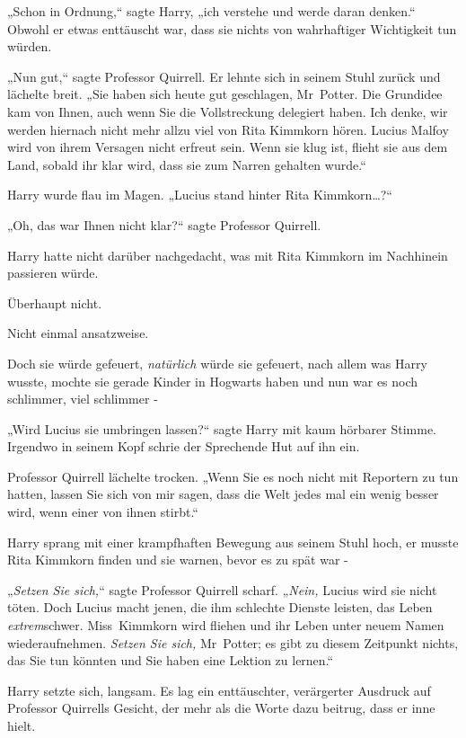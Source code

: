 {„Schon in Ordnung,“ sagte Harry, „ich verstehe und werde daran denken.“ Obwohl er etwas enttäuscht war, dass sie nichts von wahrhaftiger Wichtigkeit tun würden.

„Nun gut,“ sagte Professor Quirrell. Er lehnte sich in seinem Stuhl zurück und lächelte breit. „Sie haben sich heute gut geschlagen, Mr~Potter. Die Grundidee kam von Ihnen, auch wenn Sie die Vollstreckung delegiert haben. Ich denke, wir werden hiernach nicht mehr allzu viel von Rita Kimmkorn hören. Lucius Malfoy wird von ihrem Versagen nicht erfreut sein. Wenn sie klug ist, flieht sie aus dem Land, sobald ihr klar wird, dass sie zum Narren gehalten wurde.“

Harry wurde flau im Magen. „Lucius stand hinter Rita Kimmkorn…?“

„Oh, das war Ihnen nicht klar?“ sagte Professor Quirrell.

Harry hatte nicht darüber nachgedacht, was mit Rita Kimmkorn im Nachhinein passieren würde.

Überhaupt nicht.

Nicht einmal ansatzweise.

Doch sie würde gefeuert, \emph{natürlich} würde sie gefeuert, nach allem was Harry wusste, mochte sie gerade Kinder in Hogwarts haben und nun war es noch schlimmer, viel schlimmer -

„Wird Lucius sie umbringen lassen?“ sagte Harry mit kaum hörbarer Stimme. Irgendwo in seinem Kopf schrie der Sprechende Hut auf ihn ein.

Professor Quirrell lächelte trocken. „Wenn Sie es noch nicht mit Reportern zu tun hatten, lassen Sie sich von mir sagen, dass die Welt jedes mal ein wenig besser wird, wenn einer von ihnen stirbt.“

Harry sprang mit einer krampfhaften Bewegung aus seinem Stuhl hoch, er musste Rita Kimmkorn finden und sie warnen, bevor es zu spät war -

„\emph{Setzen Sie sich,}“ sagte Professor Quirrell scharf. „\emph{Nein,} Lucius wird sie nicht töten. Doch Lucius macht jenen, die ihm schlechte Dienste leisten, das Leben \emph{extrem}schwer. Miss~Kimmkorn wird fliehen und ihr Leben unter neuem Namen wiederaufnehmen. \emph{Setzen Sie sich,} Mr~Potter; es gibt zu diesem Zeitpunkt nichts, das Sie tun könnten und Sie haben eine Lektion zu lernen.“

Harry setzte sich, langsam. Es lag ein enttäuschter, verärgerter Ausdruck auf Professor Quirrells Gesicht, der mehr als die Worte dazu beitrug, dass er inne hielt.

}
